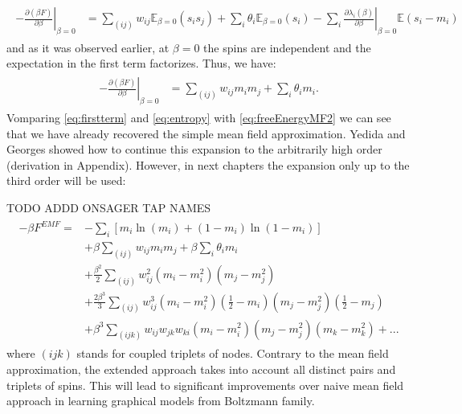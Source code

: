 \documentclass[../report/report.tex]{subfiles}
\begin{document}
\begin{align}
\begin{split}
 - \left. \frac{\partial (\beta F)}{\partial \beta}\right|_{\beta = 0} & =  \sum_{(ij)} w_{ij} \mathbb{E}_{\beta =0}(s_i s_j) + \sum_i \theta_i \mathbb{E}_{\beta =0}(s_i) - \sum_i  \left.\frac{\partial\lambda_i (\beta)}{\partial \beta}\right|_{\beta = 0}\mathbb{E}(s_i - m_i) 
 \end{split}
\end{align}
and as it was observed earlier, at $\beta =0$ the spins are independent and the expectation in the first term factorizes. Thus, we have:
\begin{align}
\begin{split}
 - \left. \frac{\partial (\beta F)}{\partial \beta}\right|_{\beta = 0} & =  \sum_{(ij)} w_{ij} m_i m_j +  \sum_i \theta_i m_i.
 \label{eq:firstterm} 
 \end{split}
\end{align}
Vomparing \ref{eq:firstterm} and \ref{eq:entropy} with \ref{eq:freeEnergyMF2} we can see that we have already recovered the simple mean field approximation. Yedida and Georges \cite{georges1991expand} showed how to continue this expansion to the arbitrarily high order (derivation in Appendix). However, in next chapters the expansion only up to the third order will be used:

TODO ADDD ONSAGER TAP NAMES
\begin{align*}
\begin{split}
-\beta F^{EMF} = & - \sum_i \left[m_i\ln (m_i) +  (1 - m_i)\ln \left( 1-m_i \right)\right]  \\
& + \beta \sum_{(ij)} w_{ij} m_i m_j + \beta \sum_i \theta_i m_i\\
& + \frac{\beta^2}{2} \sum_{(ij)} w_{ij}^2 (m_i - m_i^2)(m_j-m_j^2)\\
& + \frac{2\beta^3}{3} \sum_{(ij)} w_{ij}^3 (m_i - m_i^2)(\frac{1}{2} - m_i)(m_j - m_j^2)(\frac{1}{2} - m_j)\\
& +\beta^3 \sum_{(ijk)} w_{ij}w_{jk}w_{ki} (m_i - m_i^2)(m_j - m_j^2)(m_k - m_k^2) + ...
\label{eq:EMFexpansion}
\end{split}
\end{align*}
where $(ijk)$ stands for coupled triplets of nodes. Contrary to the mean field approximation, the extended approach takes into account all distinct pairs and triplets of spins. This will lead to significant improvements over naive mean field approach
in learning graphical models from Boltzmann family.
\end{document}
